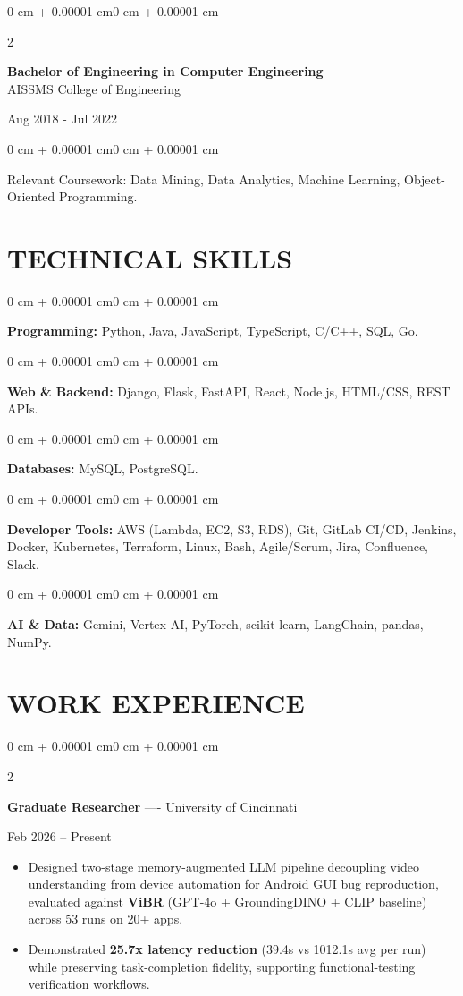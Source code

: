\documentclass[10pt, letterpaper]{article}
\newenvironment{highlights}{
    \begin{itemize}[
        topsep=0.10 cm,
        parsep=0.06 cm,
        partopsep=0pt,
        itemsep=0.06 cm,
        leftmargin=12pt
    ]
}{
    \end{itemize}
}
\newenvironment{onecolentry}{
    \begin{adjustwidth}{0 cm + 0.00001 cm}{0 cm + 0.00001 cm}
}{
    \end{adjustwidth}
}
\newenvironment{twocolentry}[2][]{
    \onecolentry
    \def\secondColumn{#2}
    \setcolumnwidth{\fill, 4.5 cm}
    \begin{paracol}{2}
}{
    \switchcolumn \raggedleft \secondColumn
    \end{paracol}
    \endonecolentry
}
\begin{document}
\begin{twocolentry}{
    Aug 2018 - Jul 2022
}
    \textbf{Bachelor of Engineering in Computer Engineering} \\
    AISSMS College of Engineering
\end{twocolentry}
\begin{onecolentry}
Relevant Coursework: Data Mining, Data Analytics, Machine Learning, Object-Oriented Programming.
\end{onecolentry}
\section{TECHNICAL SKILLS}
\begin{onecolentry}
\textbf{Programming:} Python, Java, JavaScript, TypeScript, C/C++, SQL, Go.
\end{onecolentry}
\vspace{0.06 cm}
\begin{onecolentry}
\textbf{Web \& Backend:} Django, Flask, FastAPI, React, Node.js, HTML/CSS, REST APIs.
\end{onecolentry}
\vspace{0.06 cm}
\begin{onecolentry}
\textbf{Databases:} MySQL, PostgreSQL.
\end{onecolentry}
\vspace{0.06 cm}
\begin{onecolentry}
\textbf{Developer Tools:} AWS (Lambda, EC2, S3, RDS), Git, GitLab CI/CD, Jenkins, Docker, Kubernetes, Terraform, Linux, Bash, Agile/Scrum, Jira, Confluence, Slack.
\end{onecolentry}
\vspace{0.06 cm}
\begin{onecolentry}
\textbf{AI \& Data:} Gemini, Vertex AI, PyTorch, scikit-learn, LangChain, pandas, NumPy.
\end{onecolentry}

\section{WORK EXPERIENCE}
\begin{twocolentry}{Feb 2026 -- Present}
\textbf{Graduate Researcher} ---- University of Cincinnati
\end{twocolentry}
\begin{highlights}
  \item Designed two-stage memory-augmented LLM pipeline decoupling video understanding from device automation for Android GUI bug reproduction, evaluated against \textbf{ViBR} (GPT-4o + GroundingDINO + CLIP baseline) across 53 runs on 20+ apps.
  \item Demonstrated \textbf{25.7x latency reduction} (39.4s vs 1012.1s avg per run) while preserving task-completion fidelity, supporting functional-testing verification workflows.
\end{highlights}
\end{document}
